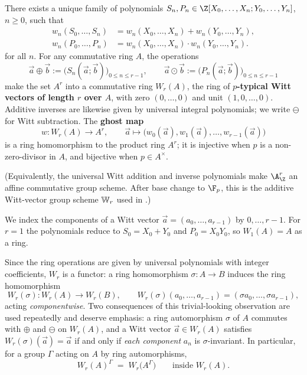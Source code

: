 \begin{theorem}
\label{theorem:witt_ring_structure}
There exists a unique family of polynomials
$S_n, P_n \in \Z[X_0, \dots, X_n; Y_0, \dots, Y_n]$, $n \geq 0$, such that
\[
\begin{aligned}
w_n(S_0, \dots, S_n)
    &= w_n(X_0,\dots,X_n) + w_n(Y_0,\dots,Y_n),\\
w_n(P_0, \dots, P_n)
    &= w_n(X_0,\dots,X_n) \cdot w_n(Y_0,\dots,Y_n).
\end{aligned}
\]
for all $n$. For any commutative ring $A$, the operations
\[
\vec a \oplus \vec b := \bigl(S_n(\vec a; \vec b)\bigr)_{0 \le n \le r-1},
\qquad
\vec a \odot \vec b := \bigl(P_n(\vec a; \vec b)\bigr)_{0 \le n \le r-1}
\]
make the set $A^r$ into a commutative ring $W_r(A)$, the ring of \textbf{$p$-typical
Witt vectors of length $r$ over $A$}, with zero $(0, \dots, 0)$ and unit
$(1, 0, \dots, 0)$. Additive inverses are likewise given by universal integral
polynomials; we write $\ominus$ for Witt subtraction. The \textbf{ghost map}
\[
w \colon W_r(A) \longrightarrow A^r,
\qquad
\vec a \longmapsto \bigl(w_0(\vec a), w_1(\vec a), \dots, w_{r-1}(\vec a)\bigr)
\]
is a ring homomorphism to the product ring $A^r$; it is injective when $p$ is a
non-zero-divisor in $A$, and bijective when $p \in A^\times$.
\end{theorem}

(Equivalently, the universal Witt addition and inverse polynomials make
$\A^r_{\Z}$ an affine commutative group scheme. After base change to
$\F_p$, this is the additive Witt-vector group scheme $\mathbb{W}_r$ used in
.)

We index the components of a Witt vector $\vec a = (a_0, \dots, a_{r-1})$ by
$0, \dots, r-1$. For $r = 1$ the polynomials reduce to $S_0 = X_0 + Y_0$ and
$P_0 = X_0 Y_0$, so $W_1(A) = A$ as a ring.

Since the ring operations are given by universal polynomials with integer
coefficients, $W_r$ is a functor: a ring homomorphism $\sigma \colon A \to B$ induces
the ring homomorphism
\[
W_r(\sigma) \colon W_r(A) \to W_r(B),
\qquad
W_r(\sigma)(a_0, \dots, a_{r-1}) = (\sigma a_0, \dots, \sigma a_{r-1}),
\]
acting \emph{componentwise}. Two consequences of this trivial-looking observation are
used repeatedly and deserve emphasis: a ring automorphism $\sigma$ of $A$ commutes
with $\oplus$ and $\ominus$ on $W_r(A)$, and a Witt vector $\vec a \in W_r(A)$
satisfies $W_r(\sigma)(\vec a) = \vec a$ if and only if \emph{each component} $a_n$ is
$\sigma$-invariant. In particular, for a group $\Gamma$ acting on $A$ by ring
automorphisms,
\begin{equation}\label{eq:witt_invariants_componentwise}
W_r(A)^{\Gamma} \;=\; W_r\bigl(A^{\Gamma}\bigr)
\qquad \text{inside } W_r(A).
\end{equation}


